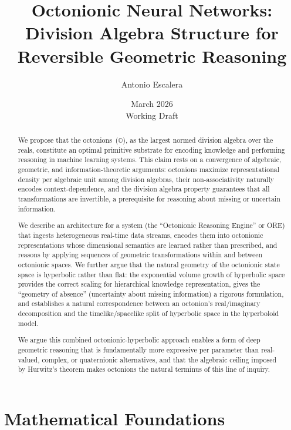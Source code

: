 \documentclass[11pt,a4paper]{article}
\title{Octonionic Neural Networks:\\Division Algebra Structure for Reversible Geometric Reasoning}
\author{Antonio Escalera}
\date{March 2026\\[0.5em]\normalsize Working Draft}
\newcommand{\Oct}{\mathbb{O}}
\begin{document}
\maketitle

\begin{abstract}
We propose that the octonions~($\Oct$), as the largest normed division algebra over the reals, constitute an optimal primitive substrate for encoding knowledge and performing reasoning in machine learning systems. This claim rests on a convergence of algebraic, geometric, and information-theoretic arguments: octonions maximize representational density per algebraic unit among division algebras, their non-associativity naturally encodes context-dependence, and the division algebra property guarantees that all transformations are invertible, a prerequisite for reasoning about missing or uncertain information.

We describe an architecture for a system (the ``Octonionic Reasoning Engine'' or ORE) that ingests heterogeneous real-time data streams, encodes them into octonionic representations whose dimensional semantics are learned rather than prescribed, and reasons by applying sequences of geometric transformations within and between octonionic spaces. We further argue that the natural geometry of the octonionic state space is hyperbolic rather than flat: the exponential volume growth of hyperbolic space provides the correct scaling for hierarchical knowledge representation, gives the ``geometry of absence'' (uncertainty about missing information) a rigorous formulation, and establishes a natural correspondence between an octonion's real/imaginary decomposition and the timelike/spacelike split of hyperbolic space in the hyperboloid model.

We argue this combined octonionic-hyperbolic approach enables a form of deep geometric reasoning that is fundamentally more expressive per parameter than real-valued, complex, or quaternionic alternatives, and that the algebraic ceiling imposed by Hurwitz's theorem makes octonions the natural terminus of this line of inquiry.
\end{abstract}

\tableofcontents
\newpage

\section{Mathematical Foundations}
\label{sec:foundations}
\end{document}
